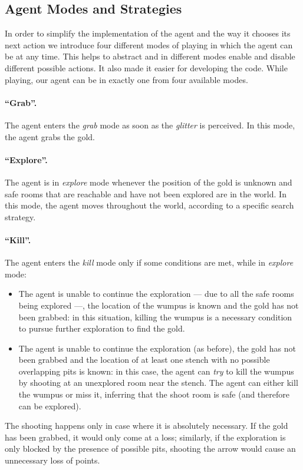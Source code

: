 \documentclass{llncs}
\begin{document}
\subsection{Agent Modes and Strategies}

In order to simplify the implementation of the agent and the way it chooses its next action we introduce four different modes of playing in which the agent can be at any time. This helps to abstract and in different modes enable and disable different possible actions. It also made it easier for developing the code.
While playing, our agent can be in exactly one from four available modes.

\paragraph{\enquote{Grab}.} The agent enters the \emph{grab} mode as soon as the \emph{glitter} is perceived. In this mode, the agent grabs the gold.

\paragraph{\enquote{Explore}.} The agent is in \emph{explore} mode whenever the position of the gold is unknown and safe rooms that are reachable and have not been explored are in the world.
In this mode, the agent moves throughout the world, according to a specific search strategy.

\paragraph{\enquote{Kill}.} The agent enters the \emph{kill} mode only if some conditions are met, while in \emph{explore} mode:
\begin{itemize}
	\item The agent is unable to continue the exploration --- due to all the safe rooms being explored ---, the location of the wumpus is known and the gold has not been grabbed: in this situation, killing the wumpus is a necessary condition to pursue further exploration to find the gold.
	\item The agent is unable to continue the exploration (as before), the gold has not been grabbed and the location of at least one stench with no possible overlapping pits is known: in this case, the agent can \emph{try} to kill the wumpus by shooting at an unexplored room near the stench.
	The agent can either kill the wumpus or miss it, inferring that the shoot room is safe (and therefore can be explored).
\end{itemize}
The shooting happens only in case where it is absolutely necessary.
If the gold has been grabbed, it would only come at a loss; similarly, if the exploration is only blocked by the presence of possible pits, shooting the arrow would cause an unnecessary loss of points.
\end{document}

